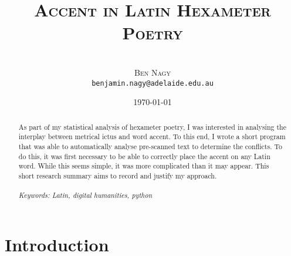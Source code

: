 \documentclass[11pt,a4paper]{scrartcl} %
\begin{document}
\title{\rmfamily\normalfont\textsc{Accent in Latin Hexameter Poetry}}
\author{\phantom{xxx}\\\textsc{Ben Nagy}\\\small{\texttt{benjamin.nagy@adelaide.edu.au}}}
\date{\normalsize{\today}}

\maketitle

\begin{abstract}
\noindent As part of my statistical analysis of hexameter poetry, I was interested in analysing the interplay between metrical ictus and word accent. To this end, I wrote a short program that was able to automatically analyse pre-scanned text to determine the conflicts. To do this, it was first necessary to be able to correctly place the accent on any Latin word. While this seems simple, it was more complicated than it may appear. This short research summary aims to record and justify my approach.\\
\phantom{xxx}\\
\noindent\textit{Keywords: Latin, digital humanities, python}
\end{abstract}

\setlength{\parindent}{0pt}

\section{Introduction}
\end{document}
